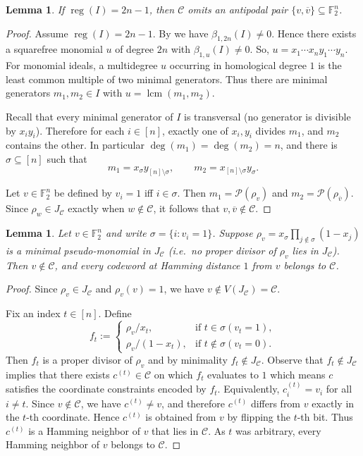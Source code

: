 \documentclass[12pt]{amsart}
\newtheorem{lemma}[theorem]{Lemma}
\theoremstyle{remark}
\theoremstyle{definition}
\DeclareMathOperator{\reg}{reg}
\DeclareMathOperator{\lcm}{lcm}
\newcommand{\F}{\mathbb{F}}
\newcommand{\C}{\mathcal{C}}
\def\P{{\mathcal P}}
\begin{document}
\begin{lemma}\label{lem:reg-max-antipodal-noncodewords}
If \(\reg(I)=2n-1\), then \(\C\) omits an antipodal pair \(\{v,\overline v\}\subseteq\F_2^n\).
\end{lemma}

\begin{proof}
Assume \(\reg(I)=2n-1\). By  we have
\(\beta_{1,2n}(I)\neq 0\). Hence there exists a squarefree monomial \(u\) of degree \(2n\) with
\(\beta_{1,u}(I)\neq 0\). So, \(u=x_1\cdots x_n y_1\cdots y_n\). For monomial ideals, a multidegree \(u\) occurring in homological degree \(1\)
is the least common multiple of two minimal generators. Thus there are minimal generators \(m_1,m_2\in I\)
with \(u=\lcm(m_1,m_2)\).

Recall that  every minimal generator of \(I\) is transversal
(no generator is divisible by \(x_i y_i\)). Therefore for each \(i\in[n]\), exactly one of \(x_i,y_i\)
divides \(m_1\), and \(m_2\) contains the other. In particular \(\deg(m_1)=\deg(m_2)=n\), and there is
\(\sigma\subseteq[n]\) such that
\[
m_1=x_\sigma y_{[n]\setminus\sigma},
\qquad
m_2=x_{[n]\setminus\sigma} y_\sigma.
\]

Let \(v\in\F_2^n\) be defined by \(v_i=1\) iff \(i\in\sigma\). Then \(m_1=\P(\rho_v)\) and
\(m_2=\P(\rho_{\overline v})\). Since \(\rho_w\in J_\C\) exactly when \(w\notin\C\), it follows that
\(v,\overline v\notin\C\).
\end{proof}



\begin{lemma}\label{lem:min-charpoly_implies_neighbors}
Let \(v\in\F_2^n\) and write \(\sigma=\{i:v_i=1\}\).
Suppose \(\rho_v=x_\sigma\prod_{j\notin\sigma}(1-x_j)\) is a minimal pseudo-monomial in \(J_\C\)
(i.e.\ no proper divisor of \(\rho_v\) lies in \(J_\C\)).
Then \(v\notin\C\), and every codeword at Hamming distance \(1\) from \(v\) belongs to \(\C\).
\end{lemma}

\begin{proof}
Since \(\rho_v\in J_\C\) and \(\rho_v(v)=1\), we have \(v\notin V(J_\C)=\C\).

Fix an index \(t\in[n]\). Define
\[
f_t  := 
\begin{cases}
\rho_v/x_t, & \text{if } t\in\sigma  (v_t=1),\\[2pt]
\rho_v/(1-x_t), & \text{if } t\notin\sigma  (v_t=0).
\end{cases}
\]
Then \(f_t\) is a proper divisor of \(\rho_v\) and by minimality \(f_t\notin J_\C\).
Observe that \(f_t\notin J_\C\)
implies that there exists \(c^{(t)}\in\C\) on which \(f_t\) evaluates to \(1\) which means \(c\) satisfies the coordinate
constraints encoded by \(f_t\). Equivalently, \(c^{(t)}_i=v_i\) for all \(i\neq t\). Since \(v\notin\C\), we have \(c^{(t)}\neq v\),
and therefore \(c^{(t)}\) differs from \(v\) exactly in the \(t\)-th coordinate. Hence \(c^{(t)}\) is obtained from \(v\) by flipping the \(t\)-th bit. Thus \(c^{(t)}\) is a Hamming neighbor of \(v\) that lies in \(\C\).
As \(t\) was arbitrary, every Hamming neighbor of \(v\) belongs to \(\C\).
\end{proof}
\end{document}
